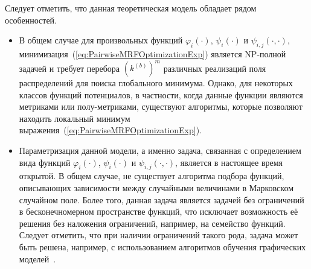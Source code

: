 Следует отметить, что данная теоретическая модель обладает рядом особенностей.
\begin{itemize}
    \item В общем случае для произвольных функций $\varphi_i(\cdot)$, $\psi_i(\cdot)$ и $\psi_{i,j}(\cdot,\cdot)$,  минимизация~(\ref{eq:PairwiseMRFOptimizationExp}) является NP-полной задачей и требует перебора $(k^{(b)})^m$ различных реализаций поля распределений для поиска глобального минимума. Однако, для некоторых классов функций потенциалов, в частности, когда данные функции являются метриками или полу-метриками, существуют алгоритмы, которые позволяют находить локальный минимум выражения~(\ref{eq:PairwiseMRFOptimizationExp}).
    \item Параметризация данной модели, а именно задача, связанная с определением вида функций  $\varphi_i(\cdot)$, $\psi_i(\cdot)$ и $\psi_{i,j}(\cdot,\cdot)$, является в настоящее время открытой. В общем случае, не существует алгоритма подбора функций, описывающих зависимости между случайными величинами в Марковском случайном поле. Более того, данная задача является задачей без ограничений в бесконечномерном пространстве функций, что исключает возможность её решения без наложения ограничений, например, на семейство функций. Следует отметить, что при наличии ограничений такого рода, задача может быть решена, например, с использованием алгоритмов обучения графических моделей~\cite{Koller}.
\end{itemize}

